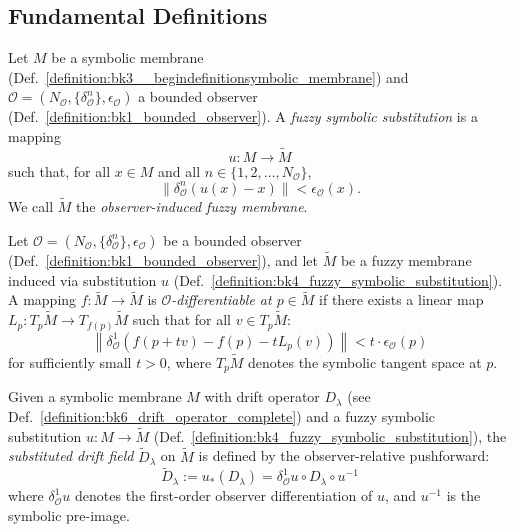\subsection{Fundamental Definitions}
\begin{definition}
\label{definition:bk4_fuzzy_symbolic_substitution}
Let $M$ be a symbolic membrane (Def.~\ref{definition:bk3__begindefinitionsymbolic_membrane}) and $\mathcal{O} = (N_\mathcal{O}, \{\delta^n_\mathcal{O}\}, \epsilon_\mathcal{O})$ a bounded observer (Def.~\ref{definition:bk1_bounded_observer}). A \emph{fuzzy symbolic substitution} is a mapping
\[
u : M \to \tilde{M}
\]
such that, for all $x \in M$ and all $n \in \{1,2,\ldots,N_\mathcal{O}\}$,
\[
\| \delta^n_\mathcal{O}(u(x) - x) \| < \epsilon_\mathcal{O}(x).
\]
We call $\tilde{M}$ the \emph{observer-induced fuzzy membrane}.
\end{definition}
\begin{definition}
\label{definition:bk4_observer_differentiable_}
Let $\mathcal{O} = (N_\mathcal{O}, \{\delta^n_\mathcal{O}\}, \epsilon_\mathcal{O})$ be a bounded observer (Def.~\ref{definition:bk1_bounded_observer}), and let $\tilde{M}$ be a fuzzy membrane induced via substitution $u$ (Def.~\ref{definition:bk4_fuzzy_symbolic_substitution}). A mapping $f: \tilde{M} \to \tilde{M}$ is \emph{$\mathcal{O}$-differentiable at $p \in \tilde{M}$} if there exists a linear map $L_p: T_p\tilde{M} \to T_{f(p)}\tilde{M}$ such that for all $v \in T_p\tilde{M}$:
\[
\left\|\delta^1_\mathcal{O}\left(f(p + tv) - f(p) - tL_p(v)\right)\right\| < t \cdot \epsilon_\mathcal{O}(p)
\]
for sufficiently small $t > 0$, where $T_p\tilde{M}$ denotes the symbolic tangent space at $p$.
\end{definition}
\begin{definition}
\label{def:bk4_substituted_drift_field}
Given a symbolic membrane $M$ with drift operator $D_\lambda$ (see Def.~\ref{definition:bk6_drift_operator_complete}) and a fuzzy symbolic substitution $u: M \to \tilde{M}$ (Def.~\ref{definition:bk4_fuzzy_symbolic_substitution}), the \emph{substituted drift field} $\tilde{D}_\lambda$ on $\tilde{M}$ is defined by the observer-relative pushforward:
\[
\tilde{D}_\lambda := u_*(D_\lambda) = \delta^1_\mathcal{O}u \circ D_\lambda \circ u^{-1}
\]
where $\delta^1_\mathcal{O}u$ denotes the first-order observer differentiation of $u$, and $u^{-1}$ is the symbolic pre-image.
\end{definition}

